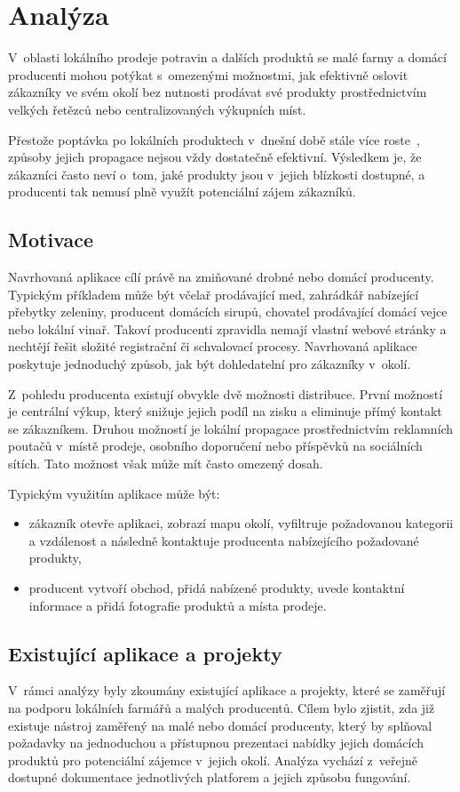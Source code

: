 \chapter{Analýza}
V~oblasti lokálního prodeje potravin a dalších produktů se malé farmy a domácí producenti mohou potýkat s~omezenými možnostmi, jak efektivně oslovit zákazníky ve svém okolí bez nutnosti prodávat své produkty prostřednictvím velkých řetězců nebo centralizovaných výkupních míst.

Přestože poptávka po lokálních produktech v~dnešní době stále více roste~\parencite{lokalni_potraviny_zajem, szif_2025}, způsoby jejich propagace nejsou vždy dostatečně efektivní.
Výsledkem je, že zákazníci často neví o~tom, jaké produkty jsou v~jejich blízkosti dostupné, a producenti tak nemusí plně využít potenciální zájem zákazníků.


\section{Motivace}
Navrhovaná aplikace cílí právě na zmiňované drobné nebo domácí producenty.
Typickým příkladem může být včelař prodávající med, zahrádkář nabízející přebytky zeleniny, producent domácích sirupů, chovatel prodávající domácí vejce nebo lokální vinař.
Takoví producenti zpravidla nemají vlastní webové stránky a nechtějí řešit složité registrační či schvalovací procesy.
Navrhovaná aplikace poskytuje jednoduchý způsob, jak být dohledatelní pro zákazníky v~okolí.

Z~pohledu producenta existují obvykle dvě možnosti distribuce.
První možností je centrální výkup, který snižuje jejich podíl na zisku a eliminuje přímý kontakt se zákazníkem.
Druhou možností je lokální propagace prostřednictvím reklamních poutačů v~místě prodeje, osobního doporučení nebo příspěvků na sociálních sítích.
Tato možnost však může mít často omezený dosah.

Typickým využitím aplikace může být:
\begin{itemize}
    \item zákazník otevře aplikaci, zobrazí mapu okolí, vyfiltruje požadovanou kategorii a vzdálenost a následně kontaktuje producenta nabízejícího požadované produkty,
    \item producent vytvoří obchod, přidá nabízené produkty, uvede kontaktní informace a přidá fotografie produktů a místa prodeje.
\end{itemize}


\section{Existující aplikace a projekty}
V~rámci analýzy byly zkoumány existující aplikace a projekty, které se zaměřují na podporu lokálních farmářů a malých producentů.
Cílem bylo zjistit, zda již existuje nástroj zaměřený na malé nebo domácí producenty, který by splňoval požadavky na jednoduchou a přístupnou prezentaci nabídky jejich domácích produktů pro potenciální zájemce v~jejich okolí.
Analýza vychází z~veřejně dostupné dokumentace jednotlivých platforem a jejich způsobu fungování.

